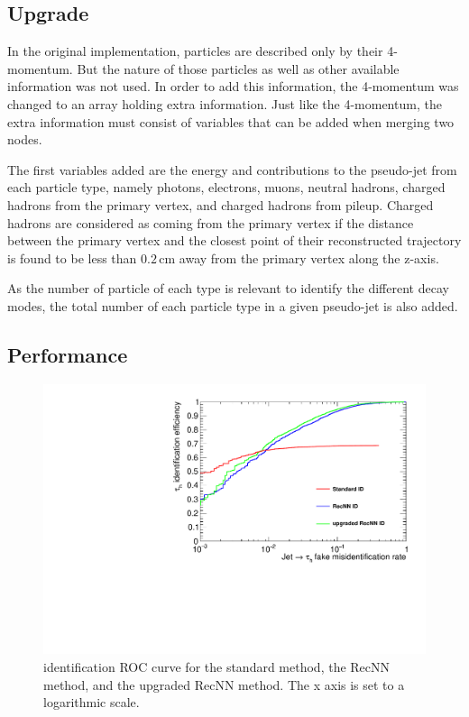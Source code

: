 \subsection{Upgrade}

In the original implementation, particles are described only by their 4-momentum. But the nature of those particles as well as other available information was not used. In order to add this information, the 4-momentum was changed to an array holding extra information. Just like the 4-momentum, the extra information must consist of variables that can be added when merging two nodes.

The first variables added are the energy and \pt contributions to the pseudo-jet from each particle type, namely photons, electrons, muons, neutral hadrons, charged hadrons from the primary vertex, and charged hadrons from pileup. Charged hadrons are considered as coming from the primary vertex if the distance between the primary vertex and the closest point of their reconstructed trajectory is found to be less than $0.2\,\mathrm{cm}$ away from the primary vertex along the z-axis.

As the number of particle of each type is relevant to identify the different \tauh decay modes, the total number of each particle type in a given pseudo-jet is also added.

\subsection{Performance}

\begin{figure}
    \centering
    \includegraphics[width=\textwidth]{Images/ROC_comp_all.pdf}
    \caption{\tauh identification ROC curve for the standard method, the RecNN method, and the upgraded RecNN method. The x axis is set to a logarithmic scale.}
    \label{fig:RecNN_ROC}
\end{figure}


